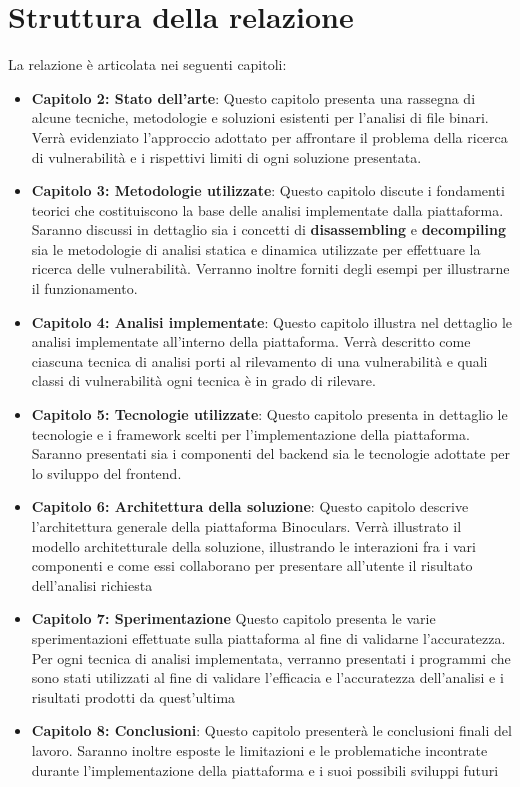 \documentclass[../main.tex]{subfiles}
\begin{document}
\section{Struttura della relazione}
La relazione è articolata nei seguenti capitoli:
\begin{itemize}
    \item \textbf{Capitolo 2: Stato dell'arte}: Questo capitolo presenta una rassegna di alcune tecniche, metodologie e soluzioni esistenti per l'analisi di file binari. Verrà evidenziato l'approccio adottato per affrontare il problema della ricerca di vulnerabilità e i
    rispettivi limiti di ogni soluzione presentata.
    \item \textbf{Capitolo 3: Metodologie utilizzate}: Questo capitolo discute i fondamenti teorici che costituiscono la base delle analisi implementate dalla piattaforma. Saranno discussi in dettaglio sia i concetti di \textbf{disassembling} e \textbf{decompiling} sia
    le metodologie di analisi statica e dinamica utilizzate per effettuare la ricerca delle vulnerabilità. Verranno inoltre forniti degli esempi per illustrarne il funzionamento.
    \item \textbf{Capitolo 4: Analisi implementate}: Questo capitolo illustra nel dettaglio le analisi implementate all'interno della piattaforma. Verrà descritto come ciascuna tecnica di analisi porti al rilevamento di una vulnerabilità e quali classi di vulnerabilità ogni tecnica è in grado di rilevare.
    \item \textbf{Capitolo 5: Tecnologie utilizzate}: Questo capitolo presenta in dettaglio le tecnologie e i framework scelti per l'implementazione della piattaforma. Saranno presentati sia i componenti del backend sia le tecnologie adottate per lo sviluppo del frontend.
    \item \textbf{Capitolo 6: Architettura della soluzione}: Questo capitolo descrive l'architettura generale della piattaforma Binoculars. Verrà illustrato il modello architetturale della soluzione, illustrando le interazioni fra i vari componenti e come essi collaborano per presentare all'utente il risultato dell'analisi richiesta    
    \item \textbf{Capitolo 7: Sperimentazione} Questo capitolo presenta le varie sperimentazioni effettuate sulla piattaforma al fine di validarne l'accuratezza. Per ogni tecnica di analisi implementata, verranno presentati i programmi che sono stati utilizzati al fine di validare l'efficacia e l'accuratezza dell'analisi e i risultati prodotti da quest'ultima 
    \item \textbf{Capitolo 8: Conclusioni}: Questo capitolo presenterà le conclusioni finali del lavoro. Saranno inoltre esposte le limitazioni e le problematiche incontrate durante l'implementazione della piattaforma e i suoi possibili sviluppi futuri
\end{itemize}
\end{document}
